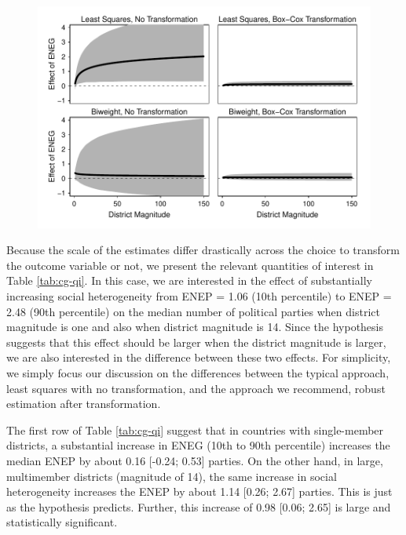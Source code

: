 \documentclass[12pt]{article}
\begin{document}
\begin{figure}[h!]
\begin{center}
\includegraphics[scale = 0.8]{figs/cg-fd-plots.pdf}
\caption{}\label{fig:cg-fd-plots}
\end{center}
\end{figure}

Because the scale of the estimates differ drastically across the choice to transform the outcome variable or not, we present the relevant quantities of interest in Table \ref{tab:cg-qi}. In this case, we are interested in the effect of substantially increasing social heterogeneity from ENEP = 1.06 (10th percentile) to ENEP = 2.48 (90th percentile) on the median number of political parties when district magnitude is one and also when district magnitude is 14. Since the hypothesis suggests that this effect should be larger when the district magnitude is larger, we are also interested in the difference between these two effects. For simplicity, we simply focus our discussion on the differences between the typical approach, least squares with no transformation, and the approach we recommend, robust estimation after transformation.

The first row of Table \ref{tab:cg-qi} suggest that in countries with single-member districts, a substantial increase in ENEG (10th to 90th percentile) increases the median ENEP by about 0.16 [-0.24; 0.53] parties. On the other hand, in large, multimember districts (magnitude of 14), the same increase in social heterogeneity increases the ENEP by about 1.14 [0.26; 2.67] parties. This is just as the hypothesis predicts. Further, this increase of 0.98 [0.06; 2.65] is large and statistically significant.
\end{document}
